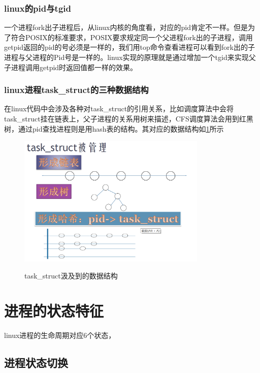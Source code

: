 \subsection{linux的pid与tgid}
一个进程fork出子进程后，从linux内核的角度看，对应的pid肯定不一样。但是为了符合POSIX的标准要求，POSIX要求规定同一个父进程fork出的子进程，调用getpid返回的pid的号必须是一样的，我们用top命令查看进程可以看到fork出的子进程与父进程的Pid号是一样的。linux实现的原理就是通过增加一个tgid来实现父子进程调用getpid时返回值都一样的效果。
\begin{tcolorbox}[colback=blue!5,colframe=blue!75!black,title=pid和tgid 视频]
\end{tcolorbox}

\subsection{linux进程task\_struct的三种数据结构}
在linux代码中会涉及各种对task\_struct的引用关系，比如调度算法中会将task\_struct挂在链表上，父子进程的关系用树来描述，CFS调度算法会用到红黑树，通过pid查找进程则是用hash表的结构。其对应的数据结构如\ref{task_datastructure}所示

\begin{figure}[H]
 \wdfigbox
  {\caption{task\_struct汲及到的数据结构}\label{task_datastructure}}
  {
  \includegraphics[width=9cm]{./figure/task_datastructure.png}
  }
\end{figure}
\chapter{进程的状态特征}
linux进程的生命周期对应6个状态，
\section{进程状态切换}
